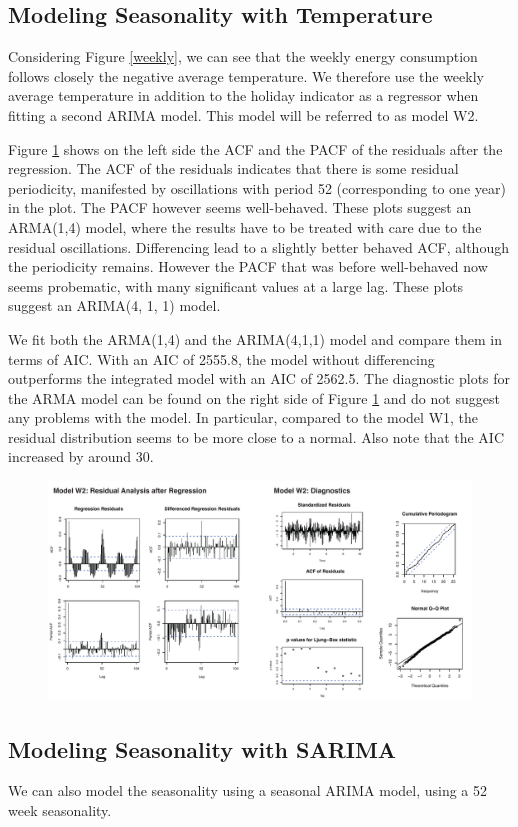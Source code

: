 \documentclass[conference]{IEEEtran}
\begin{document}
\subsection{Modeling Seasonality with Temperature}
Considering Figure \ref{weekly}, we can see that the weekly energy consumption follows closely the negative average temperature. We therefore use the weekly average temperature in addition to the holiday indicator as a regressor when fitting a second ARIMA model. This model will be referred to as model W2.
\par
Figure \ref{weekly_mod2} shows on the left side the ACF and the PACF of the residuals after the regression. The ACF of the residuals indicates that there is some residual periodicity, manifested by oscillations with period 52 (corresponding to one year) in the plot. The PACF however seems well-behaved. These plots suggest an ARMA(1,4) model, where the results have to be treated with care due to the residual oscillations. Differencing lead to a slightly better behaved ACF, although the periodicity remains. However the PACF that was before well-behaved now seems probematic, with many significant values at a large lag. These plots suggest an ARIMA(4, 1, 1) model.
\par
We fit both the ARMA(1,4) and the ARIMA(4,1,1) model and compare them in terms of AIC. With an AIC of 2555.8, the model without differencing outperforms the integrated model with an AIC of 2562.5. The diagnostic plots for the ARMA model can be found on the right side of Figure \ref{weekly_mod2} and do not suggest any problems with the model. In particular, compared to the model W1, the residual distribution seems to be more close to a normal. Also note that the AIC increased by around 30. 

\begin{figure}[ht]
	\centering
	\includegraphics[width=1\textwidth]{Figs/Fig4.pdf}
	\caption{}
	\label{weekly_mod2}
\end{figure}

\subsection{Modeling Seasonality with SARIMA}
We can also model the seasonality using a seasonal ARIMA model, using a 52 week seasonality. 


\begin{thebibliography}{00}

\item
\end{thebibliography}
\end{document}

